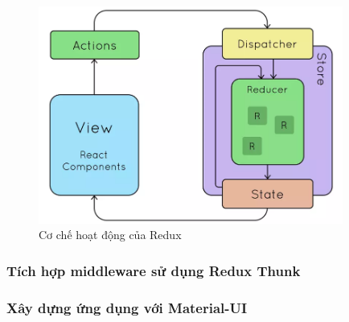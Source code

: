 \begin{figure}[h!]
    \begin{center}
        \includegraphics[width=10cm]{Image/Technical/redux-flow.png}
        \caption{Cơ chế hoạt động của Redux}
        \label{redux-flow}
    \end{center}
\end{figure}

\subsubsection{Tích hợp middleware sử dụng Redux Thunk}



\subsubsection{Xây dựng ứng dụng với Material-UI}

